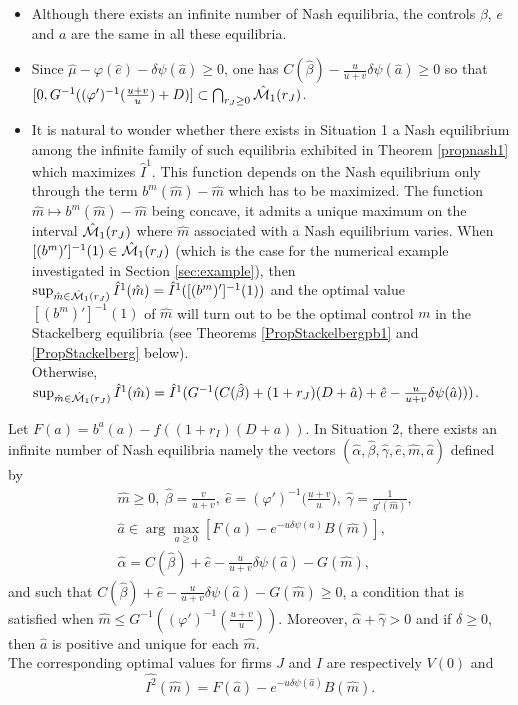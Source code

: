 \documentclass{svjour3}
\begin{document}
 
 \begin{remark} \label{remmaxnash}
 \begin{itemize}
\item Although there exists an infinite number of Nash equilibria, the controls  $\beta$, $e$ and $a$ are the same in all these equilibria. 
   \item Since $\hat{\mu}-\varphi(\hat e)-\delta\psi(\hat a)\geq 0$, one has  $C(\hat \beta)-\frac{u}{u+v}\delta\psi(\hat a)\geq 0$ so that\\ $[0,G^{-1}((\varphi')^{-1}(\frac{u+v}{u})+D)]\subset\bigcap_{r_J\geq 0}\hat{\cal M}_1(r_J)$.\item It is natural to wonder whether there exists in Situation 1  a Nash equilibrium among the infinite family of such equilibria exhibited in Theorem \ref{propnash1} which maximizes $\hat{I}^1$. This function depends on the Nash equilibrium only through the term $b^m(\hat m)-\hat{m}$ which has to be maximized. The function $\hat m\mapsto b^m(\hat m)-\hat{m}$ being concave, it admits a unique maximum on the interval $\hat{\cal M}_1(r_J)$ where $\hat{m}$ associated with a Nash equilibrium varies. When $[(b^m)']^{-1}(1)\in\hat{\cal M}_1(r_J)$ (which is the case for the numerical example investigated in Section \ref{sec:example}), then $\sup_{\hat{m}\in\hat{\cal M}_1(r_J)}\hat{I}^1(\hat{m})=\hat{I}^1([(b^m)']^{-1}(1))$ and the optimal value $[(b^m)']^{-1}(1)$ of $\hat{m}$ will turn out to be the optimal control $m$ in the Stackelberg equilibria (see Theorems \ref{PropStackelbergpb1} and \ref{PropStackelberg} below).
	\\
	Otherwise, $\sup_{\hat{m}\in\hat{\cal M}_1(r_J)}\hat{I}^1(\hat{m})=\hat{I}^1(G^{-1}(C(\hat \beta)+(1+r_J)(D+\hat a)+\hat e-\frac{u}{u+v}\delta\psi(\hat a)))$.
 \end{itemize}
 \end{remark}

\begin{theorem}
\label{propnash2}
 Let $F(a)=b^a(a)-f((1+r_I)(D+a))$. 
In Situation 2, there exists an infinite number of Nash equilibria namely the vectors $(\hat\alpha, \hat\beta, \hat\gamma, \hat e,\hat m, \hat a)$ defined by
\begin{eqnarray}
\label{NashEqui}
&\hat{m}\geq 0,~\hat\beta=\frac{v}{u+v},~\hat e=(\varphi')^{-1}\Big(\frac{u+v}{u}\Big),~\hat\gamma=\frac{1}{g'(\hat m)},
\\
\label{NashEqui2}
&\hat a\in\arg\max_{a\geq 0} \left[ F(a)-e^{-u\delta\psi(a)}   B(\hat m)\right],
\\\label{NashEqui3}
&\hat\alpha=C(\hat \beta)+\hat e-\frac{u}{u+v}\delta\psi(\hat a)-G(\hat m),
\end{eqnarray}
and such that $C(\hat \beta)+\hat e-\frac{u}{u+v}\delta\psi(\hat a)-G(\hat m)\geq 0$, a condition that is satisfied when $\hat{m}\leq G^{-1}((\varphi')^{-1}(\frac{u+v}{u}))$. 
Moreover, $\hat\alpha+\hat\gamma>0$ and if $\delta\geq 0$, then $\hat a$ is positive and unique for each $\hat m$.
\\
The corresponding optimal values for firms $J$ and $I$ are respectively $V(0)$ and
$$\hat{I^2}(\hat m)=F(\hat a)-e^{-u\delta\psi(\hat a)}
B(\hat m).$$
\end{theorem}
\end{document}
